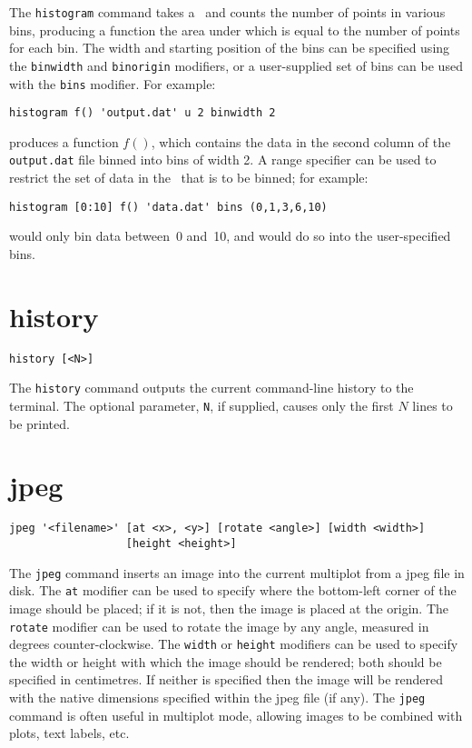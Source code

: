 The {\tt histogram} command takes a \datafile\ and counts the number of points
in various bins, producing a function the area under which is equal to the
number of points for each bin.  The width and starting position of the bins can
be specified using the {\tt binwidth} and {\tt binorigin} modifiers, or a
user-supplied set of bins can be used with the {\tt bins} modifier.  For
example:

\begin{verbatim}
histogram f() 'output.dat' u 2 binwidth 2
\end{verbatim}

\noindent produces a function $f()$, which contains the data in the second
column of the {\tt output.dat} file binned into bins of width 2.  A range
specifier can be used to restrict the set of data in the \datafile\ that is to be
binned; for example:

\begin{verbatim}
histogram [0:10] f() 'data.dat' bins (0,1,3,6,10)
\end{verbatim}

\noindent would only bin data between~0 and~10, and would do so into the
user-specified bins.

\section{history}

\begin{verbatim}
history [<N>]
\end{verbatim}

The {\tt history} command outputs the current command-line history to the
terminal.  The optional parameter, {\tt N}, if supplied, causes only the first
$N$ lines to be printed.

\section{jpeg}

\begin{verbatim}
jpeg '<filename>' [at <x>, <y>] [rotate <angle>] [width <width>]
                  [height <height>]
\end{verbatim}

The {\tt jpeg} command inserts an image into the current multiplot from a jpeg
file in disk.  The {\tt at} modifier can be used to specify where the
bottom-left corner of the image should be placed; if it is not, then the image
is placed at the origin. The {\tt rotate} modifier can be used to rotate the
image by any angle, measured in degrees counter-clockwise.  The {\tt width} or
{\tt height} modifiers can be used to specify the width or height with which
the image should be rendered; both should be specified in centimetres. If
neither is specified then the image will be rendered with the native dimensions
specified within the jpeg file (if any). The {\tt jpeg} command is often useful
in multiplot mode, allowing images to be combined with plots, text labels, etc.

